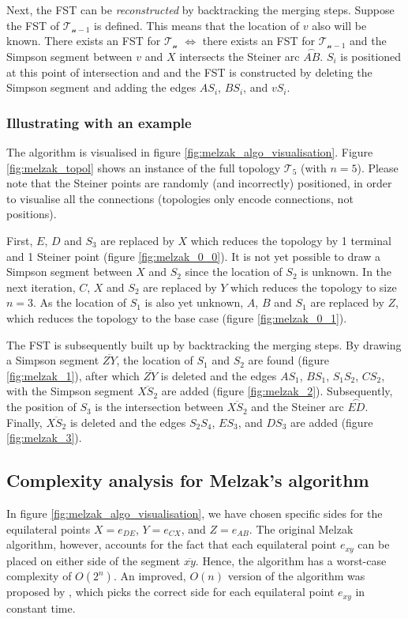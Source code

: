 \documentclass{l4proj}
\newcommand{\arc}[1]{\stackrel{\frown}{#1}}
\begin{document}
Next, the FST can be \textit{reconstructed} by backtracking the merging steps.
Suppose the FST of $\mathcal{T_{n-1}}$ is defined. This means that the location of $v$ also will be known.
There exists an FST for $\mathcal{T_n}$ $\iff$ there exists an FST for $\mathcal{T_{n-1}}$ and the Simpson segment between $v$ and $X$ intersects the Steiner arc $\arc{AB}$. $S_i$ is positioned at this point of intersection and and the FST is constructed by deleting the Simpson segment and adding the edges $AS_i$, $BS_i$, and $vS_i$.

\subsubsection{Illustrating with an example}
The algorithm is visualised in figure \ref{fig:melzak_algo_visualisation}.
Figure \ref{fig:melzak_topol} shows an instance of the full topology $\mathcal{T_5}$ (with $n = 5$). Please note that the Steiner points are randomly (and incorrectly) positioned, in order to visualise all the connections (topologies only encode connections, not positions).

First, $E$, $D$ and $S_3$ are replaced by $X$ which reduces the topology by 1 terminal and 1 Steiner point (figure \ref{fig:melzak_0_0}). It is not yet possible to draw a Simpson segment between $X$ and $S_2$ since the location of $S_2$ is unknown.
In the next iteration, $C$, $X$ and $S_2$ are replaced by $Y$ which reduces the topology to size $n = 3$. As the location of $S_1$ is also yet unknown, $A$, $B$ and $S_1$ are replaced by $Z$, which reduces the topology to the base case (figure \ref{fig:melzak_0_1}).

The FST is subsequently built up by backtracking the merging steps. By drawing a Simpson segment $\overline{ZY}$, the location of $S_1$ and $S_2$ are found (figure \ref{fig:melzak_1}), after which $\overline{ZY}$ is deleted and the edges $AS_1$, $BS_1$, $S_1S_2$, $CS_2$, with the Simpson segment $\overline{XS_2}$ are added (figure \ref{fig:melzak_2}).
Subsequently, the position of $S_3$ is the intersection between $\overline{XS_2}$ and the Steiner arc $\arc{ED}$. Finally, $\overline{XS_2}$ is deleted and the edges $S_2S_4$, $ES_3$, and $DS_3$ are added (figure \ref{fig:melzak_3}).


\subsection{Complexity analysis for Melzak's algorithm}
In figure \ref{fig:melzak_algo_visualisation}, we have chosen specific sides for the equilateral points $X = e_{DE}$, $Y = e_{CX}$, and $Z = e_{AB}$.
The original Melzak algorithm, however, accounts for the fact that each equilateral point $e_{xy}$ can be placed on either side of the segment $\overline{xy}$. Hence, the algorithm has a worst-case complexity of $O(2^n)$.
An improved, $O(n)$ version of the algorithm was proposed by \cite{Melzak_linear_time}, which picks the correct side for each equilateral point $e_{xy}$ in constant time.
\end{document}
